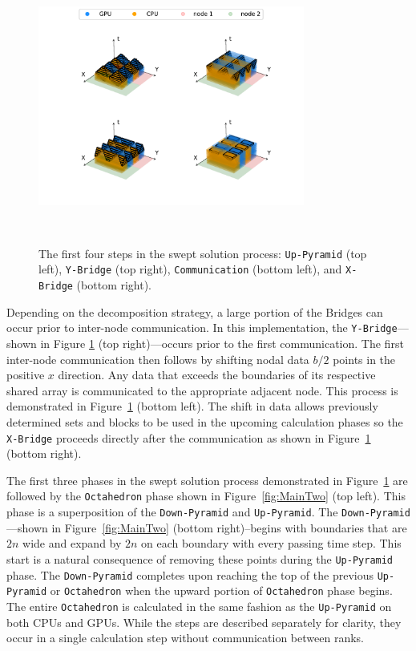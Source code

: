 \documentclass[preprints,article,accept,moreauthors,pdftex]{Definitions/mdpi}
\def\Up{\texttt{Up-Pyramid}}
\def\Down{\texttt{Down-Pyramid}}
\def\Oct{\texttt{Octahedron}}
\def\Xb{\texttt{X-Bridge}}
\def\Yb{\texttt{Y-Bridge}}
\begin{document}
\begin{figure}[htbp]
    \centering
    \includegraphics[height=9cm,width=0.78\textwidth, trim={1cm 0.6cm 0.25cm 0.2cm},clip]{figs/SubsPlot1.pdf}
    \caption{The first four steps in the swept solution process: \Up{} (top left), \Yb{} (top right), \texttt{Communication} (bottom left), and \Xb{} (bottom right).}
    \label{fig:MainOne}
\end{figure}

Depending on the decomposition strategy, a large portion of the Bridges can occur prior to inter-node communication. In this implementation, the \Yb{}---shown in Figure \ref{fig:MainOne} (top right)---occurs prior to the first communication. The first inter-node communication then follows by shifting nodal data $b/2$ points in the positive $x$ direction. Any data that exceeds the boundaries of its respective shared array is communicated to the appropriate adjacent node. This process is demonstrated in Figure~\ref{fig:MainOne} (bottom left). The shift in data allows previously determined sets and blocks to be used in the upcoming calculation phases so the \Xb{} proceeds directly after the communication as shown in Figure~\ref{fig:MainOne} (bottom right).

The first three phases in the swept solution process demonstrated in Figure~\ref{fig:MainOne} are followed by the \Oct{} phase shown in Figure~\ref{fig:MainTwo} (top left). This phase is a superposition of the \Down{} and \Up{}. The \Down{}---shown in Figure~\ref{fig:MainTwo} (bottom right)--begins with boundaries that are $2n$ wide and expand by $2n$ on each boundary with every passing time step. This start is a natural consequence of removing these points during the \Up{} phase. The \Down{} completes upon reaching the top of the previous \Up{} or \Oct{} when the upward portion of \Oct{} phase begins. The entire \Oct{} is calculated in the same fashion as the \Up{} on both CPUs and GPUs. While the steps are described separately for clarity, they occur in a single calculation step without communication between ranks. 
\end{document}
